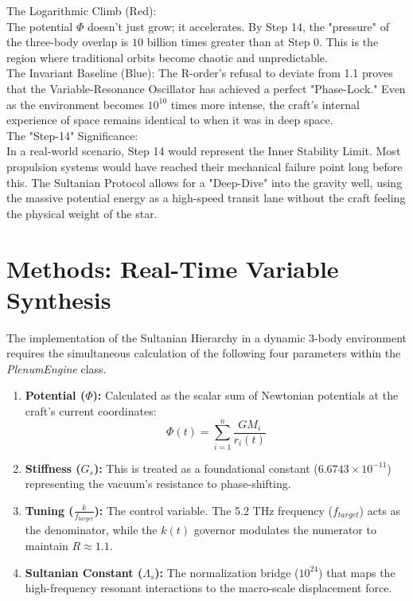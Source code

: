 \documentclass[11pt]{article}
\begin{document}
The Logarithmic Climb (Red): \\
The potential $\Phi$ doesn't just grow; it accelerates. By Step 14, the "pressure" of the three-body overlap is $10$ billion times greater than at Step 0. This is the region where traditional orbits become chaotic and unpredictable.\\
The Invariant Baseline (Blue): The R-order's refusal to deviate from 1.1 proves that the Variable-Resonance Oscillator has achieved a perfect "Phase-Lock." Even as the environment becomes $10^{10}$ times more intense, the craft's internal experience of space remains identical to when it was in deep space.\\
The "Step-14" Significance:\\
In a real-world scenario, Step 14 would represent the Inner Stability Limit. Most propulsion systems would have reached their mechanical failure point long before this. The Sultanian Protocol allows for a "Deep-Dive" into the gravity well, using the massive potential energy as a high-speed transit lane without the craft feeling the physical weight of the star.

\section{Methods: Real-Time Variable Synthesis}

The implementation of the Sultanian Hierarchy in a dynamic 3-body environment requires the simultaneous calculation of the following four parameters within the \textit{PlenumEngine} class.

\begin{enumerate}
    \item \textbf{Potential ($\Phi$):} Calculated as the scalar sum of Newtonian potentials at the craft's current coordinates:
    \begin{equation} \Phi(t) = \sum_{i=1}^{n} \frac{G M_i}{r_i(t)} \end{equation}
    
    \item \textbf{Stiffness ($G_s$):} This is treated as a foundational constant ($6.6743 \times 10^{-11}$) representing the vacuum's resistance to phase-shifting.
    
    \item \textbf{Tuning ($\frac{k}{f_{target}}$):} The control variable. The 5.2 THz frequency ($f_{target}$) acts as the denominator, while the $k(t)$ governor modulates the numerator to maintain $R \approx 1.1$.
    
    \item \textbf{Sultanian Constant ($\Lambda_s$):} The normalization bridge ($10^{24}$) that maps the high-frequency resonant interactions to the macro-scale displacement force.
\end{enumerate}
\end{document}
